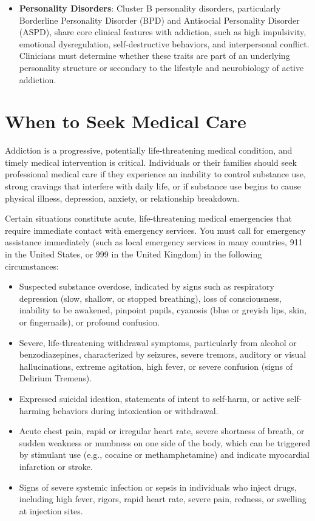 \begin{itemize}
    \item \textbf{Personality Disorders}: Cluster B personality disorders, particularly Borderline Personality Disorder (BPD) and Antisocial Personality Disorder (ASPD), share core clinical features with addiction, such as high impulsivity, emotional dysregulation, self-destructive behaviors, and interpersonal conflict. Clinicians must determine whether these traits are part of an underlying personality structure or secondary to the lifestyle and neurobiology of active addiction.
\end{itemize}

\section*{When to Seek Medical Care}
Addiction is a progressive, potentially life-threatening medical condition, and timely medical intervention is critical. Individuals or their families should seek professional medical care if they experience an inability to control substance use, strong cravings that interfere with daily life, or if substance use begins to cause physical illness, depression, anxiety, or relationship breakdown.

Certain situations constitute acute, life-threatening medical emergencies that require immediate contact with emergency services. You must call for emergency assistance immediately (such as local emergency services in many countries, 911 in the United States, or 999 in the United Kingdom) in the following circumstances:
\begin{itemize}
    \item Suspected substance overdose, indicated by signs such as respiratory depression (slow, shallow, or stopped breathing), loss of consciousness, inability to be awakened, pinpoint pupils, cyanosis (blue or greyish lips, skin, or fingernails), or profound confusion.
    \item Severe, life-threatening withdrawal symptoms, particularly from alcohol or benzodiazepines, characterized by seizures, severe tremors, auditory or visual hallucinations, extreme agitation, high fever, or severe confusion (signs of Delirium Tremens).
    \item Expressed suicidal ideation, statements of intent to self-harm, or active self-harming behaviors during intoxication or withdrawal.
    \item Acute chest pain, rapid or irregular heart rate, severe shortness of breath, or sudden weakness or numbness on one side of the body, which can be triggered by stimulant use (e.g., cocaine or methamphetamine) and indicate myocardial infarction or stroke.
    \item Signs of severe systemic infection or sepsis in individuals who inject drugs, including high fever, rigors, rapid heart rate, severe pain, redness, or swelling at injection sites.
\end{itemize}

